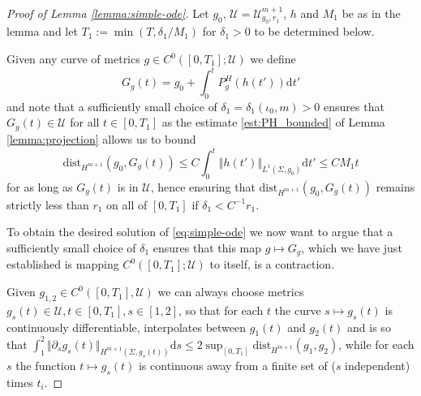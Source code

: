 \documentclass[10pt,reqno]{amsart}
\theoremstyle{plain}
\theoremstyle{definition}
\numberwithin{equation}{section}
\newcommand{\de}{\delta}
\newcommand{\Si}{\Sigma}
\newcommand{\norm}[1]{\Vert#1\Vert}
\newcommand{\beq}{\begin{equation}}
\newcommand{\eeq}{\end{equation}}
\newcommand{\dd}{\mathrm{d}} %
\newcommand{\dist}{\text{dist}}
\newcommand{\UU}{{\mathcal U}}
\newcommand{\p}{\partial} %
\begin{document}
\begin{proof}[Proof of Lemma \ref{lemma:simple-ode}]
    Let $g_0$, $\UU=\UU_{g_0,r_1}^{m+1}$, $h$ and $M_1$ be as in the lemma and let $T_1:=\min(T, \de_1/M_1)$ for $\de_1>0$ to be determined below. 
    
    Given any curve of metrics $g\in C^0([0,T_1];\UU)$ we define
    \beq\label{eq:tilde-g-ODE}
        G_g(t)=g_0+\int_0^t P^H_{g}(h(t'))\dd t'
    \eeq
    and note that a sufficiently small choice of  $\de_1=\de_1(\iota_0,m)>0$  ensures that $G_g(t)\in \UU$ for all  $t\in [0,T_1]$ as the estimate \eqref{est:PH_bounded} of Lemma \ref{lemma:projection} allows us to bound 
    \beq\label{est:dist-simple-ode}
        \dist_{H^{m+1}}(g_0,G_g(t))\leq C \int_0^t\norm{h(t')}_{L^1(\Si,g_0)} \dd t'\leq CM_1t
    \eeq
    for as long as $G_g(t)$ is in $\UU$, hence ensuring that $\dist_{H^{m+1}}(g_0,G_g(t))$ remains strictly less than $r_1$ on all of $[0,T_1]$ if $\de_1<C^{-1}r_1$. 

    To obtain the desired solution of \eqref{eq:simple-ode} we now want to argue that a sufficiently small choice of $\de_1$ ensures that this map $g\mapsto G_g$, which we have just established is mapping  $C^0([0,T_1];\UU)$ to itself, is a contraction. 
      
    Given $g_{1,2}\in C^0([0,T_1],\UU)$  we can always choose metrics $g_s(t)\in \UU, t\in [0,T_1], s\in [1,2]$, so that for each $t$ the curve $s\mapsto g_s(t)$ is continuously differentiable,  interpolates between  $g_1(t)$ and $g_2(t)$ and is so that $\int_1^2\norm{\p_s g_s(t)}_{H^{m+1}(\Si,g_s(t))} \dd s\leq 2\sup_{[0,T_1] }\dist_{H^{m+1}}(g_1,g_2)$,  while for each $s$ the function $t\mapsto g_s(t)$ is continuous away from a finite set of ($s$ independent) times $t_i$.
     

\end{proof}
\end{document}
